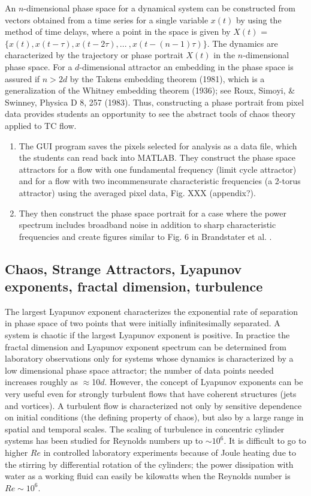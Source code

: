 \documentclass[%
reprint,
 amsmath,amssymb,
 aps,
prb,
floatfix,
longbibliography,
notitlepage
]{revtex4-1}
\begin{document}
An $n$-dimensional phase space for a dynamical system can be constructed from vectors obtained from a time series for a single variable $x(t)$ by using the method of time delays, where a point in the space is given by $X(t)$ = $\{x(t), x(t-\tau), x(t-2\tau), . . .  \ , x(t-(n-1)\tau)\}$. The dynamics are characterized by the trajectory or phase portrait $X(t)$ in the $n$-dimensional phase space.  For a $d$-dimensional attractor an embedding in the phase space is assured if $n > 2d$ by the Takens embedding theorem (1981), which is a generalization of the Whitney embedding theorem (1936); see Roux, Simoyi, $\&$ Swinney, Physica D 8, 257 (1983). Thus, constructing a phase portrait from pixel data provides students an opportunity to see the abstract tools of chaos theory applied to TC flow.

\begin{enumerate}
\item The GUI program saves the pixels selected for analysis as a data file, which the students can read back into MATLAB. They construct the phase space attractors for a flow with one fundamental frequency (limit cycle attractor) and for a flow with two incommensurate characteristic frequencies (a 2-torus attractor) using the averaged pixel data, Fig. XXX (appendix?).
\item They then construct the phase space portrait for a case where the power spectrum includes broadband noise in addition to sharp characteristic frequencies and create figures similar to Fig. 6 in Brandstater et al. \cite{brandstater_et_al_1987}.
\end{enumerate}

\subsection{Chaos, Strange Attractors, Lyapunov exponents, fractal dimension, turbulence}

The largest Lyapunov exponent characterizes the exponential rate of separation in phase space of two points that were initially infinitesimally separated.  A system is chaotic if the largest Lyapunov exponent is positive.  In practice the fractal dimension and Lyapunov exponent spectrum can be determined from laboratory observations only for systems whose dynamics is characterized by a low dimensional phase space attractor; the number of data points needed increases roughly as $\approx$10$d$.  However, the concept of Lyapunov exponents can be very useful even for strongly turbulent flows that have coherent structures (jets and vortices). A turbulent flow is characterized not only by sensitive dependence on initial conditions (the defining property of chaos), but also by a large range in spatial and temporal scales. The scaling of turbulence in concentric cylinder systems has been studied for Reynolds numbers up to $\sim10^6$.   It is difficult to go to higher $Re$ in controlled laboratory experiments because of Joule heating due to the stirring by differential rotation of the cylinders; the power dissipation with water as a working fluid can easily be kilowatts when the Reynolds number is $Re\sim10^6$.
\end{document}
